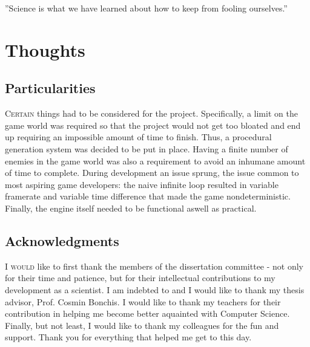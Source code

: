 \begin{savequote}[75mm] 
”Science is what we have learned about how to keep from fooling ourselves.”
\end{savequote}

\chapter{Thoughts}
\section{Particularities}
\lettrine[lines=1]{\color{Crimson}C}{ertain} things had to be considered for the project. Specifically, a limit on the game world was required so that the project would not get too bloated and end up requiring an impossible amount of time to finish. Thus, a procedural generation system was decided to be put in place. Having a finite number of enemies in the game world was also a requirement to avoid an inhumane amount of time to complete. During development an issue sprung, the issue common to most aspiring game developers: the naive infinite loop resulted in variable framerate and variable time difference that made the game nondeterministic.\cite{c.fabien} Finally, the engine itself needed to be functional aswell as practical.
\section{Acknowledgments}
\lettrine[lines=1]{\color{Crimson}I}{ would} like to first thank the members of the dissertation committee - not only for their time and patience, but for their intellectual contributions to my development as a scientist. I am indebted to and I would like to thank my thesis advisor, Prof. Cosmin Bonchis. I would like to thank my teachers for their contribution in helping me become better aquainted with Computer Science. Finally, but not least, I would like to thank my colleagues for the fun and support. Thank you for everything that helped me get to this day.
\afterpage{\clearpage}